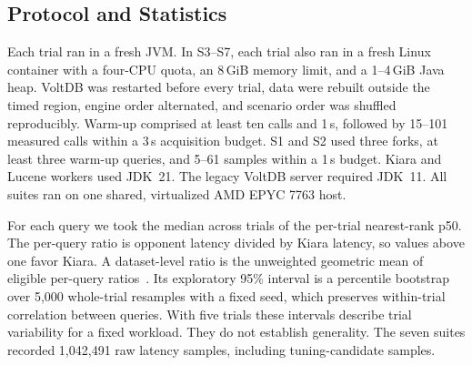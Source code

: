 \subsection{Protocol and Statistics}
Each trial ran in a fresh JVM. In S3--S7, each trial also ran in a fresh Linux container with a four-CPU quota, an 8\,GiB memory limit, and a 1--4\,GiB Java heap. VoltDB was restarted before every trial, data were rebuilt outside the timed region, engine order alternated, and scenario order was shuffled reproducibly. Warm-up comprised at least ten calls and 1\,s, followed by 15--101 measured calls within a 3\,s acquisition budget. S1 and S2 used three forks, at least three warm-up queries, and 5--61 samples within a 1\,s budget. Kiara and Lucene workers used JDK~21. The legacy VoltDB server required JDK~11. All suites ran on one shared, virtualized AMD EPYC 7763 host.

For each query we took the median across trials of the per-trial nearest-rank p50. The per-query ratio is opponent latency divided by Kiara latency, so values above one favor Kiara. A dataset-level ratio is the unweighted geometric mean of eligible per-query ratios~\cite{fleming1986how}. Its exploratory 95\% interval is a percentile bootstrap~\cite{efron1993introduction} over 5,000 whole-trial resamples with a fixed seed, which preserves within-trial correlation between queries. With five trials these intervals describe trial variability for a fixed workload. They do not establish generality. The seven suites recorded 1,042,491 raw latency samples, including tuning-candidate samples.
